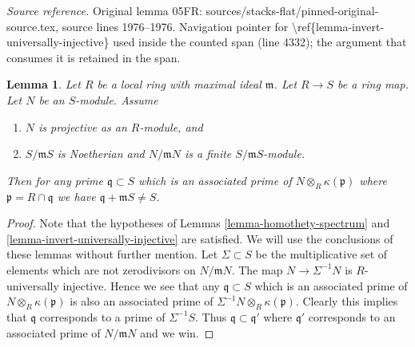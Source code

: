 \documentclass[10pt,a4paper]{amsart}
\theoremstyle{plain}
\newtheorem{lemma}[subsection]{Lemma}
\theoremstyle{definition}
\theoremstyle{remark}
\numberwithin{equation}{subsection}
\begin{document}
\noindent\textit{Source reference.} Original lemma 05FR: sources/stacks-flat/pinned-original-source.tex, source lines 1976--1976. Navigation pointer for \textbackslash{}ref\{lemma-invert-universally-injective\} used inside the counted span (line 4332); the argument that consumes it is retained in the span.\par\medskip
\begin{lemma}
\label{lemma-explain-why-pure}
Let $R$ be a local ring with maximal ideal $\mathfrak m$.
Let $R \to S$ be a ring map. Let $N$ be an $S$-module.
Assume
\begin{enumerate}
\item $N$ is projective as an $R$-module, and
\item $S/\mathfrak mS$ is Noetherian and $N/\mathfrak mN$ is a finite
$S/\mathfrak mS$-module.
\end{enumerate}
Then for any prime $\mathfrak q \subset S$ which is an associated prime of
$N \otimes_R \kappa(\mathfrak p)$ where $\mathfrak p = R \cap \mathfrak q$
we have $\mathfrak q + \mathfrak m S \not = S$.
\end{lemma}

\begin{proof}
Note that the hypotheses of
Lemmas \ref{lemma-homothety-spectrum} and
\ref{lemma-invert-universally-injective}
are satisfied. We will use the conclusions of these lemmas without further
mention. Let $\Sigma \subset S$ be the multiplicative set of elements
which are not zerodivisors on $N/\mathfrak mN$. The map
$N \to \Sigma^{-1}N$ is $R$-universally injective. Hence we see that
any $\mathfrak q \subset S$ which is an associated prime of
$N \otimes_R \kappa(\mathfrak p)$ is also an associated prime of
$\Sigma^{-1}N \otimes_R \kappa(\mathfrak p)$. Clearly this implies that
$\mathfrak q$ corresponds to a prime of $\Sigma^{-1}S$.
Thus $\mathfrak q \subset \mathfrak q'$ where $\mathfrak q'$
corresponds to an associated prime of $N/\mathfrak mN$ and we win.
\end{proof}
\end{document}
